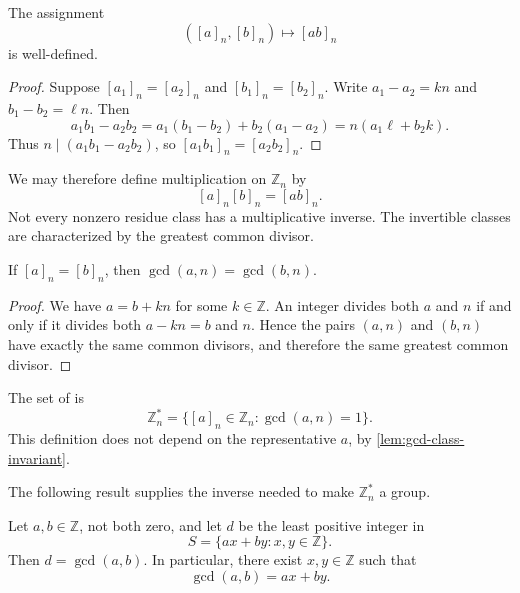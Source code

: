 \begin{lemma}\label{lem:multiplication-well-defined}
	The assignment
	\[
		([a]_n,[b]_n)\longmapsto[ab]_n
	\]
	is well-defined.
\end{lemma}

\begin{proof}
	Suppose \([a_1]_n=[a_2]_n\) and \([b_1]_n=[b_2]_n\). Write
	\(a_1-a_2=kn\) and \(b_1-b_2=\ell n\). Then
	\[
		a_1b_1-a_2b_2
		=a_1(b_1-b_2)+b_2(a_1-a_2)
		=n(a_1\ell+b_2k).
	\]
	Thus \(n\mid(a_1b_1-a_2b_2)\), so \([a_1b_1]_n=[a_2b_2]_n\).
\end{proof}

We may therefore define multiplication on \(\mathbb Z_n\) by
\[
	[a]_n[b]_n=[ab]_n.
\]
Not every nonzero residue class has a multiplicative inverse. The invertible classes are
characterized by the greatest common divisor.

\begin{lemma}\label{lem:gcd-class-invariant}
	If \([a]_n=[b]_n\), then \(\gcd(a,n)=\gcd(b,n)\).
\end{lemma}

\begin{proof}
	We have \(a=b+kn\) for some \(k\in\mathbb Z\). An integer divides both \(a\) and
	\(n\) if and only if it divides both \(a-kn=b\) and \(n\). Hence the pairs
	\((a,n)\) and \((b,n)\) have exactly the same common divisors, and therefore the
	same greatest common divisor.
\end{proof}

\begin{definition}
	The set of  is
	\[
		\mathbb Z_n^*=\{[a]_n\in\mathbb Z_n:\gcd(a,n)=1\}.
	\]
	This definition does not depend on the representative \(a\), by
	\autoref{lem:gcd-class-invariant}.
\end{definition}

The following result supplies the inverse needed to make \(\mathbb Z_n^*\) a group.

\begin{proposition}\label{prop:bezout}
	Let \(a,b\in\mathbb Z\), not both zero, and let \(d\) be the least positive integer in
	\[
		S=\{ax+by:x,y\in\mathbb Z\}.
	\]
	Then \(d=\gcd(a,b)\). In particular, there exist \(x,y\in\mathbb Z\) such that
	\[
		\gcd(a,b)=ax+by.
	\]
\end{proposition}

